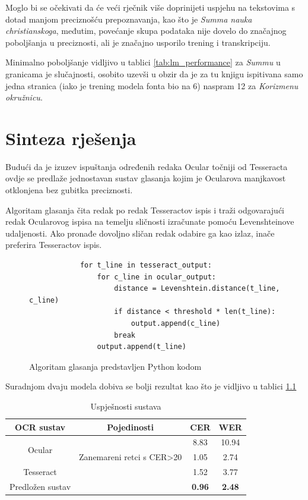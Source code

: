 \documentclass[zavrsnirad]{fer}
\begin{document}
Moglo bi se očekivati da će veći rječnik više doprinijeti uspjehu na tekstovima s dotad manjom preciznošću prepoznavanja, kao što je \textit{Summa nauka christianskoga}, međutim, povećanje skupa podataka nije dovelo do značajnog poboljšanja u preciznosti, ali je značajno usporilo trening i transkripciju.

Minimalno poboljšanje vidljivo u tablici \ref{tab:lm_performance} za \textit{Summu} u granicama je slučajnosti, osobito uzevši u obzir da je za tu knjigu ispitivana samo jedna stranica (iako je trening modela fonta bio na 6) naspram 12 za \textit{Korizmenu okružnicu}.

\chapter{Sinteza rješenja}
\label{pog:sinteza_rješenja}

Budući da je izuzev ispuštanja određenih redaka Ocular točniji od Tesseracta ovdje se predlaže jednostavan sustav glasanja kojim je Ocularova manjkavost otklonjena bez gubitka preciznosti.

Algoritam glasanja čita redak po redak Tesseractov ispis i traži odgovarajući redak Ocularovog ispisa na temelju sličnosti izračunate pomoću Levenshteinove udaljenosti. Ako pronađe dovoljno sličan redak odabire ga kao izlaz, inače preferira Tesseractov ispis.

\begin{figure}[h]
	\centering
	\begin{adjustwidth}{1cm}{1cm}
		\begin{lstlisting}
			for t_line in tesseract_output:
				for c_line in ocular_output:
					distance = Levenshtein.distance(t_line, c_line)
					if distance < threshold * len(t_line):
						output.append(c_line)
					break
				output.append(t_line)
		\end{lstlisting}
	\end{adjustwidth}
	\caption{Algoritam glasanja predstavljen Python kodom}
	\label{fig:python_code}
\end{figure}

Suradnjom dvaju modela dobiva se bolji rezultat kao što je vidljivo u tablici \ref{tab:system_performance}

\bgroup
\def\arraystretch{1.25}
\begin{table}[h]
	\centering
	\begin{tabular}{|c|c|c|c|}
		\hline
		\textbf{OCR sustav} & \textbf{Pojedinosti} & \textbf{CER} & \textbf{WER} \\ \hline
		\multirow{2}{*}{Ocular} & & 8.83 & 10.94 \\ \cline{2-4}
								& Zanemareni retci s CER>20 & 1.05 & 2.74 \\ \hline
		Tesseract & & 1.52 & 3.77 \\ \hline
		Predložen sustav & & \textbf{0.96} & \textbf{2.48} \\ \hline
	\end{tabular}
	\caption{Uspješnosti sustava}
	\label{tab:system_performance}
\end{table}
\egroup
\end{document}

